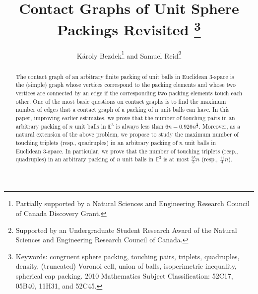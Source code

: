 \documentclass[10pt]{article}
\title{Contact Graphs of Unit Sphere Packings Revisited
\footnote{Keywords: congruent sphere packing, touching pairs, triplets, quadruples, density, (truncated) Voronoi cell, union of balls, isoperimetric inequality, spherical cap packing.  
2010 Mathematics Subject Classification: 52C17, 05B40, 11H31, and 52C45.}}
\author{K\'{a}roly Bezdek\thanks{Partially supported by a Natural Sciences and 
Engineering Research Council of Canada Discovery Grant.} and Samuel Reid\thanks{Supported by an Undergraduate Student Research Award of the Natural Sciences and Engineering Research Council of Canada.}}
\numberwithin{Subcase}{Case}
\begin{document}
\maketitle

\begin{abstract}
The contact graph of an arbitrary finite packing of unit balls in Euclidean 3-space is the (simple) graph whose vertices correspond to the packing elements and whose two vertices are connected by an edge if the corresponding two packing elements touch each other. One of the most basic questions on contact graphs is to find the maximum number of edges that a contact graph of a packing of n unit balls can have. In this paper, improving earlier estimates, we prove that the number of touching pairs in an arbitrary packing of $n$ unit balls in $\mathbb{E}^{3}$ is always less than $6n-0.926n^{\frac{2}{3}}$. Moreover, as a natural extension of the above problem, we propose to study the maximum number of touching triplets (resp., quadruples) in an arbitrary packing of $n$ unit balls in Euclidean 3-space. In particular, we prove that the number of touching triplets (resp., quadruples) in an arbitrary packing of $n$ unit balls in $\mathbb{E}^3$ is at most $\frac{25}{3}n$ (resp., $\frac{11}{4}n$).
\end{abstract}
\end{document}
